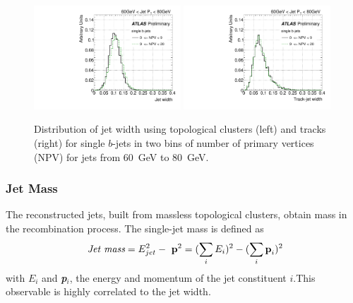 \begin{figure}[tp]
\centering
\includegraphics[width=0.49\textwidth]{FIGS/systematics/Widthsingle_060.pdf}
\includegraphics[width=0.49\textwidth]{FIGS/systematics/trkWidthsingle_060.pdf}
\caption{Distribution of jet width using topological clusters (left) and tracks (right) for single $b$-jets in two bins of number of primary vertices (NPV) for jets from 60~GeV to 80~GeV.}
\label{fig:trkwidthpileup}
\end{figure}


\subsubsection{Jet Mass} 



 The reconstructed jets, built from massless topological clusters, obtain mass in the recombination process. The single-jet mass is defined as 
%
\begin{equation}
\mbox{ {\it Jet mass}} = E^2_{jet} - \mbox{ \emph{{\bf p}}}^2 = (\sum_i E_i)^2 - (\sum_i \mbox{\emph{{\bf p}}}_i)^2
\end{equation}
%
with  $E_i$ and \emph{\bf{p}}$_i$, the energy and momentum of the jet constituent $i$.This observable is highly correlated to the jet width.


